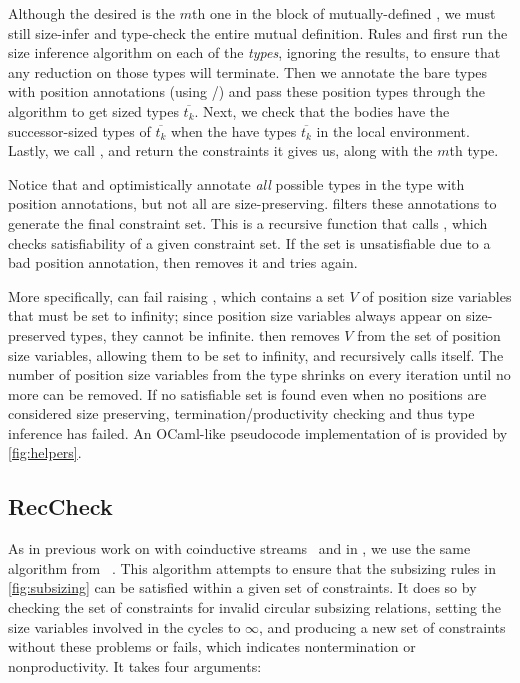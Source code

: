 Although the desired \cofixpoint is the $m$th one in the block of mutually-defined \cofixpoints, we must still size-infer and type-check the entire mutual definition.
Rules  and  first run the size inference algorithm on each of the \cofixpoint \emph{types}, ignoring the results, to ensure that any reduction on those types will terminate.
Then we annotate the bare types with position annotations (using \setrecstars/\setcorecstars) and pass these position types through the algorithm to get sized types $\overline{t_k}$.
Next, we check that the \cofixpoint bodies have the successor-sized types of $\overline{t_k}$ when the \cofixpoints have types $\overline{t_k}$ in the local environment.
Lastly, we call \RecCheckLoop, and return the constraints it gives us, along with the $m$th \cofixpoint type.



Notice that \setrecstars and \setcorecstars optimistically annotate \textit{all} possible \coinductive types in the \cofixpoint type with position annotations, but not all \cofixpoints are size-preserving.
\RecCheckLoop filters these annotations to generate the final constraint set.
This is a recursive function that calls \RecCheck, which checks satisfiability of a given constraint set.
If the set is unsatisfiable due to a bad position annotation, then \RecCheckLoop removes it and tries again.

More specifically, \RecCheck can fail raising \RecCheckFail, which contains a set $V$ of position size variables that must be set to infinity; since position size variables always appear on size-preserved types, they cannot be infinite.
\RecCheckLoop then removes $V$ from the set of position size variables, allowing them to be set to infinity, and recursively calls itself.
The number of position size variables from the \cofixpoint type shrinks on every iteration until no more can be removed.
If no satisfiable set is found even when no positions are considered size preserving, termination/productivity checking and thus type inference has failed.
An OCaml-like pseudocode implementation of \RecCheckLoop is provided by \autoref{fig:helpers}.

\subsection{RecCheck}

As in previous work on \CChatomega with coinductive streams~\citep{cc-hat-omega} and in \CIChat, we use the same \RecCheck algorithm from \Fhat~\citep{f-hat}.
This algorithm attempts to ensure that the subsizing rules in \autoref{fig:subsizing} can be satisfied within a given set of constraints.
It does so by checking the set of constraints for invalid circular subsizing relations, setting the size variables involved in the cycles to $\infty$, and producing a new set of constraints without these problems or fails, which indicates nontermination or nonproductivity.
It takes four arguments:

